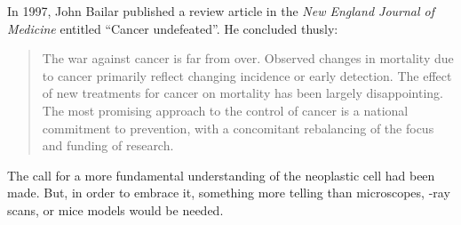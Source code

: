 
\medskip

In 1997, John Bailar published a review article in the \emph{New England Journal
  of Medicine} entitled ``Cancer undefeated''.\cite{bailar_cancer_1997} He
concluded thusly:

\begin{quotation}
  The war against cancer is far from over.  Observed changes in mortality due to
  cancer primarily reflect changing incidence or early detection.  The effect of
  new treatments for cancer on mortality has been largely disappointing.  The
  most promising approach to the control of cancer is a national commitment to
  prevention, with a concomitant rebalancing of the focus and funding of
  research.
\end{quotation}

The call for a more fundamental understanding of the neoplastic cell had been
made. But, in order to embrace it, something more telling than microscopes,
-ray scans, or mice models would be needed.







